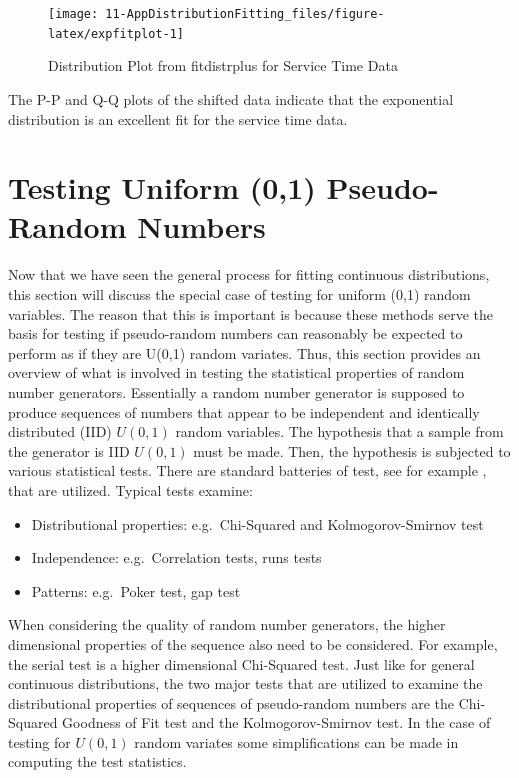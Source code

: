 \documentclass[
]{book}
\theoremstyle{definition}
\theoremstyle{definition}
\theoremstyle{definition}
\theoremstyle{definition}
\theoremstyle{remark}
\begin{document}
\begin{figure}

{\centering \texttt{[image: 11-AppDistributionFitting\_files/figure-latex/expfitplot-1]} 

}

\caption{Distribution Plot from fitdistrplus for Service Time Data}\label{fig:expfitplot}
\end{figure}

The P-P and Q-Q plots of the shifted data indicate that the exponential distribution is an excellent fit for the service time data.

\hypertarget{app:distfit:testU01}{%
\section{Testing Uniform (0,1) Pseudo-Random Numbers}\label{app:distfit:testU01}}

Now that we have seen the general process for fitting continuous distributions, this section will discuss the special case of testing for uniform (0,1) random variables. The reason that this is important is because these methods serve the basis for testing if pseudo-random numbers can reasonably be expected to perform as if they are U(0,1) random variates. Thus, this section provides an overview of what is involved in testing
the statistical properties of random number generators. Essentially a
random number generator is supposed to produce sequences of numbers that
appear to be independent and identically distributed (IID) \(U(0,1)\)
random variables. The hypothesis that a sample from the generator is IID
\(U(0,1)\) must be made. Then, the hypothesis is subjected to various
statistical tests. There are standard batteries of test, see for example
\citep{soto1999statistical}, that are utilized. Typical tests examine:

\begin{itemize}
\item
  Distributional properties: e.g.~Chi-Squared and Kolmogorov-Smirnov
  test
\item
  Independence: e.g.~Correlation tests, runs tests
\item
  Patterns: e.g.~Poker test, gap test
\end{itemize}

When considering the quality of random number generators, the higher
dimensional properties of the sequence also need to be considered. For
example, the serial test is a higher dimensional Chi-Squared test. Just like for general continuous distributions, the two major tests that are utilized to examine the
distributional properties of sequences of pseudo-random numbers are the
Chi-Squared Goodness of Fit test and the Kolmogorov-Smirnov test. In the case of testing for \(U(0,1)\) random variates some simplifications can be made in computing the test statistics.
\end{document}
